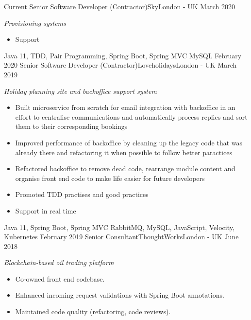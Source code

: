 %
%
%

  \begin{experiences}
    \experience
      {Current}
      {Senior Software Developer (Contractor)}{Sky}{London - UK}
      {March 2020}
      {
        \emph{Provisioning systems}
        \begin{itemize}
          \item Support
        \end{itemize}
      }
      {Java 11, TDD, Pair Programming, Spring Boot, Spring MVC}
      {MySQL}
    \emptySeparator
    \experience
      {February 2020}
      {Senior Software Developer (Contractor)}{Loveholidays}{London - UK}
      {March 2019}
      {
        \emph{Holiday planning site and backoffice support system}
        \begin{itemize}
          \item Built microservice from scratch for email integration with backoffice in an effort to centralise communications and automatically process replies and sort them to their corresponding bookings
          \item Improved performance of backoffice by cleaning up the legacy code that was already there and refactoring it when possible to follow better paractices
          \item Refactored backoffice to remove dead code, rearrange module content and organise front end code to make life easier for future developers
          \item Promoted TDD practises and good practices
          \item Support in real time
        \end{itemize}
      }
      {Java 11, Spring Boot, Spring MVC}
      {RabbitMQ, MySQL, JavaScript, Velocity, Kubernetes}
    \emptySeparator
    \experience
      {February 2019}
      {Senior Consultant}{ThoughtWorks}{London - UK}
      {June 2018}
      {
        \emph{Blockchain-based oil trading platform}
        \begin{itemize}
          \item Co-owned front end codebase.
          \item Enhanced incoming request validations with Spring Boot annotations.
          \item Maintained code quality (refactoring, code reviews).

\end{itemize}}
\end{experiences}
